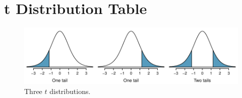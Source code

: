 \section{t Distribution Table}
\label{tDistributionTable}


\begin{figure}[h]
\centering
\includegraphics[width=\textwidth]{extraTeX/appendix/figures/tTails/tTails}
\caption{Three $t$ distributions.}
\label{tTails}
\end{figure}

